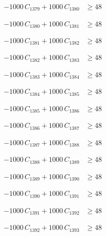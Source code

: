 \documentclass[a4paper,11pt]{article}
\begin{document}
\begin{align}
-1000\,C_{1379} + 1000\,C_{1380} &\geq 48 \nonumber
\end{align}

\begin{align}
-1000\,C_{1380} + 1000\,C_{1381} &\geq 48 \nonumber
\end{align}

\begin{align}
-1000\,C_{1381} + 1000\,C_{1382} &\geq 48 \nonumber
\end{align}

\begin{align}
-1000\,C_{1382} + 1000\,C_{1383} &\geq 48 \nonumber
\end{align}

\begin{align}
-1000\,C_{1383} + 1000\,C_{1384} &\geq 48 \nonumber
\end{align}

\begin{align}
-1000\,C_{1384} + 1000\,C_{1385} &\geq 48 \nonumber
\end{align}

\begin{align}
-1000\,C_{1385} + 1000\,C_{1386} &\geq 48 \nonumber
\end{align}

\begin{align}
-1000\,C_{1386} + 1000\,C_{1387} &\geq 48 \nonumber
\end{align}

\begin{align}
-1000\,C_{1387} + 1000\,C_{1388} &\geq 48 \nonumber
\end{align}

\begin{align}
-1000\,C_{1388} + 1000\,C_{1389} &\geq 48 \nonumber
\end{align}

\begin{align}
-1000\,C_{1389} + 1000\,C_{1390} &\geq 48 \nonumber
\end{align}

\begin{align}
-1000\,C_{1390} + 1000\,C_{1391} &\geq 48 \nonumber
\end{align}

\begin{align}
-1000\,C_{1391} + 1000\,C_{1392} &\geq 48 \nonumber
\end{align}

\begin{align}
-1000\,C_{1392} + 1000\,C_{1393} &\geq 48 \nonumber
\end{align}
\end{document}
